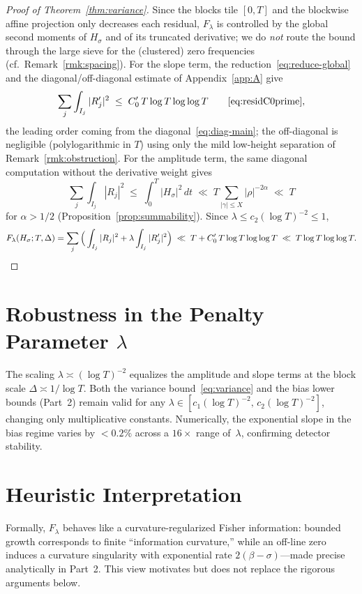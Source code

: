\begin{proof}[Proof of Theorem~\ref{thm:variance}]
Since the blocks tile $[0,T]$ and the blockwise affine projection only decreases
each residual, $F_\lambda$ is controlled by the global second moments of $H_\sigma$
and of its truncated derivative; we do \emph{not} route the bound through the
large sieve for the (clustered) zero frequencies (cf.\ Remark~\ref{rmk:spacing}).
For the slope term, the reduction~\eqref{eq:reduce-global} and the
diagonal/off-diagonal estimate of Appendix~\ref{app:A} give
\begin{equation*}
\sum_j\int_{I_j}|R_j'|^2 \;\le\; C_0'\,T\log T\log\log T
\qquad\text{\eqref{eq:residC0prime}},
\end{equation*}
the leading order coming from the diagonal~\eqref{eq:diag-main}; the off-diagonal
is negligible (polylogarithmic in $T$) using only the mild low-height separation
of Remark~\ref{rmk:obstruction}.  For the amplitude term, the same diagonal
computation without the derivative weight gives
\begin{equation*}
\sum_j\int_{I_j}|R_j|^2 \;\le\; \int_0^T|H_\sigma|^2\,dt
\;\ll\; T\sum_{|\gamma|\le X}|\rho|^{-2\alpha} \;\ll\; T
\end{equation*}
for $\alpha>1/2$ (Proposition~\ref{prop:summability}).  Since
$\lambda\le c_2(\log T)^{-2}\le1$,
\begin{equation*}
F_\lambda(H_\sigma;T,\Delta)
=\sum_j\Big(\int_{I_j}|R_j|^2+\lambda\int_{I_j}|R_j'|^2\Big)
\;\ll\; T + C_0'\,T\log T\log\log T
\;\ll\; T\log T\log\log T. \qedhere
\end{equation*}
\end{proof}

\section{Robustness in the Penalty Parameter \texorpdfstring{$\lambda$}{lambda}}

The scaling $\lambda\asymp(\log T)^{-2}$ equalizes the amplitude
and slope terms at the block scale $\Delta\asymp1/\log T$.
Both the variance bound~\eqref{eq:variance} and the bias lower bounds
(Part~2) remain valid for any
$\lambda\in[c_1(\log T)^{-2},\,c_2(\log T)^{-2}]$,
changing only multiplicative constants.
Numerically, the exponential slope in the bias regime varies by $<0.2\%$
across a $16\times$ range of~$\lambda$, confirming detector stability.

\section{Heuristic Interpretation}

Formally, $F_\lambda$ behaves like a curvature-regularized Fisher information:
bounded growth corresponds to finite “information curvature,” while an
off-line zero induces a curvature singularity with exponential rate
$2(\beta-\sigma)$—made precise analytically in Part~2.
This view motivates but does not replace the rigorous arguments below.

